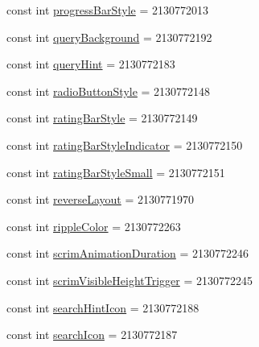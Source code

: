 \begin{DoxyCompactItemize}
\item 
const int \mbox{\hyperlink{class_f_w_p_s___app_1_1_droid_1_1_resource_1_1_attribute_acb0f8d70faed85daa988f692945482fe}{progress\+Bar\+Style}} = 2130772013
\item 
const int \mbox{\hyperlink{class_f_w_p_s___app_1_1_droid_1_1_resource_1_1_attribute_adfb878e965377ae83cde789e3b9f14cd}{query\+Background}} = 2130772192
\item 
const int \mbox{\hyperlink{class_f_w_p_s___app_1_1_droid_1_1_resource_1_1_attribute_a35a4cf3ff3edb8ff01617bc490231d5a}{query\+Hint}} = 2130772183
\item 
const int \mbox{\hyperlink{class_f_w_p_s___app_1_1_droid_1_1_resource_1_1_attribute_a42f28abc25986493b2310b6db3c9948c}{radio\+Button\+Style}} = 2130772148
\item 
const int \mbox{\hyperlink{class_f_w_p_s___app_1_1_droid_1_1_resource_1_1_attribute_ab19f210168c14080de1a4b779f53fcf6}{rating\+Bar\+Style}} = 2130772149
\item 
const int \mbox{\hyperlink{class_f_w_p_s___app_1_1_droid_1_1_resource_1_1_attribute_a97cc7186fe278160a837bfb553fc7dd1}{rating\+Bar\+Style\+Indicator}} = 2130772150
\item 
const int \mbox{\hyperlink{class_f_w_p_s___app_1_1_droid_1_1_resource_1_1_attribute_aa51e1a61d5785ca448d305806046ffd7}{rating\+Bar\+Style\+Small}} = 2130772151
\item 
const int \mbox{\hyperlink{class_f_w_p_s___app_1_1_droid_1_1_resource_1_1_attribute_af4a6f8dce9533747fd94079f695d5ddc}{reverse\+Layout}} = 2130771970
\item 
const int \mbox{\hyperlink{class_f_w_p_s___app_1_1_droid_1_1_resource_1_1_attribute_a2cfabbc3939efec06b5803be0223243d}{ripple\+Color}} = 2130772263
\item 
const int \mbox{\hyperlink{class_f_w_p_s___app_1_1_droid_1_1_resource_1_1_attribute_a250a698debdaa86064162b7d5cadac1d}{scrim\+Animation\+Duration}} = 2130772246
\item 
const int \mbox{\hyperlink{class_f_w_p_s___app_1_1_droid_1_1_resource_1_1_attribute_a31723c4d5afd87e43d94cdfa0be9788a}{scrim\+Visible\+Height\+Trigger}} = 2130772245
\item 
const int \mbox{\hyperlink{class_f_w_p_s___app_1_1_droid_1_1_resource_1_1_attribute_a7ac98943a33789a3489717b0d165b8d3}{search\+Hint\+Icon}} = 2130772188
\item 
const int \mbox{\hyperlink{class_f_w_p_s___app_1_1_droid_1_1_resource_1_1_attribute_a6459b8d15986533b247fe09e1d230024}{search\+Icon}} = 2130772187

\end{DoxyCompactItemize}
